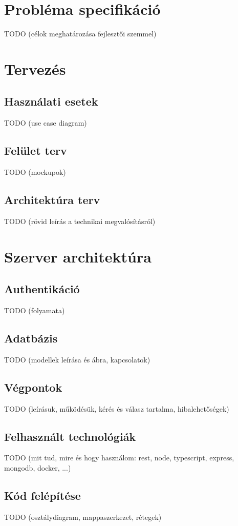 \documentclass{elteikthesis}
\begin{document}
	\section{Probléma specifikáció}
	TODO (célok meghatározása fejlesztői szemmel)

	\section{Tervezés}
	\subsection{Használati esetek}
	TODO (use case diagram)
	
	\subsection{Felület terv}
	TODO (mockupok)
	
	\subsection{Architektúra terv}
	TODO (rövid leírás a technikai megvalósításról)
	
	\section{Szerver architektúra}
	\subsection{Authentikáció}
	TODO (folyamata)
	
	\subsection{Adatbázis}
	TODO (modellek leírása és ábra, kapcsolatok)
	
	\subsection{Végpontok}
	TODO (leírásuk, működésük, kérés és válasz tartalma, hibalehetőségek)
	
	\subsection{Felhasznált technológiák}
	TODO (mit tud, mire és hogy használom: rest, node, typescript, express, mongodb, docker, ...)
	
	\subsection{Kód felépítése}
	TODO (osztálydiagram, mappaszerkezet, rétegek)
	
\end{document}
